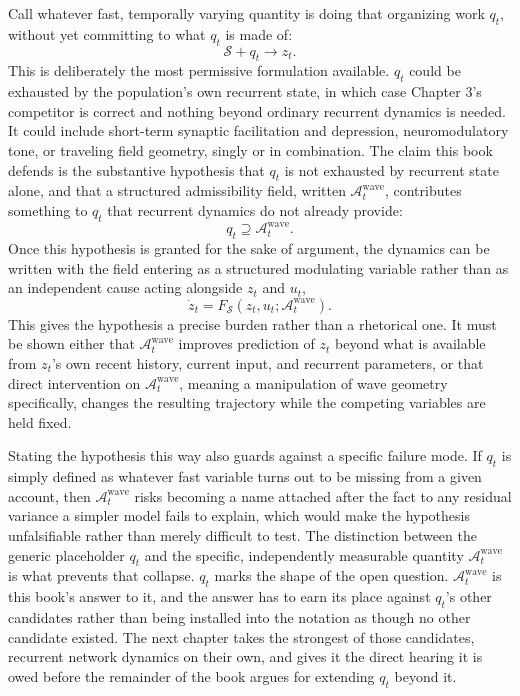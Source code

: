\documentclass[11pt]{book}
\begin{document}
Call whatever fast, temporally varying quantity is doing that organizing work $q_t$, without yet committing to what $q_t$ is made of:
\[
\mathcal S + q_t \longrightarrow z_t.
\]
This is deliberately the most permissive formulation available. $q_t$ could be exhausted by the population's own recurrent state, in which case Chapter 3's competitor is correct and nothing beyond ordinary recurrent dynamics is needed. It could include short-term synaptic facilitation and depression, neuromodulatory tone, or traveling field geometry, singly or in combination. The claim this book defends is the substantive hypothesis that $q_t$ is not exhausted by recurrent state alone, and that a structured admissibility field, written $\mathcal A_t^{\mathrm{wave}}$, contributes something to $q_t$ that recurrent dynamics do not already provide:
\[
q_t \supseteq \mathcal A_t^{\mathrm{wave}}.
\]
Once this hypothesis is granted for the sake of argument, the dynamics can be written with the field entering as a structured modulating variable rather than as an independent cause acting alongside $z_t$ and $u_t$,
\[
\dot z_t = F_{\mathcal S}\!\left(z_t, u_t; \mathcal A_t^{\mathrm{wave}}\right).
\]
This gives the hypothesis a precise burden rather than a rhetorical one. It must be shown either that $\mathcal A_t^{\mathrm{wave}}$ improves prediction of $z_t$ beyond what is available from $z_t$'s own recent history, current input, and recurrent parameters, or that direct intervention on $\mathcal A_t^{\mathrm{wave}}$, meaning a manipulation of wave geometry specifically, changes the resulting trajectory while the competing variables are held fixed.

Stating the hypothesis this way also guards against a specific failure mode. If $q_t$ is simply defined as whatever fast variable turns out to be missing from a given account, then $\mathcal A_t^{\mathrm{wave}}$ risks becoming a name attached after the fact to any residual variance a simpler model fails to explain, which would make the hypothesis unfalsifiable rather than merely difficult to test. The distinction between the generic placeholder $q_t$ and the specific, independently measurable quantity $\mathcal A_t^{\mathrm{wave}}$ is what prevents that collapse. $q_t$ marks the shape of the open question. $\mathcal A_t^{\mathrm{wave}}$ is this book's answer to it, and the answer has to earn its place against $q_t$'s other candidates rather than being installed into the notation as though no other candidate existed. The next chapter takes the strongest of those candidates, recurrent network dynamics on their own, and gives it the direct hearing it is owed before the remainder of the book argues for extending $q_t$ beyond it.
\end{document}
